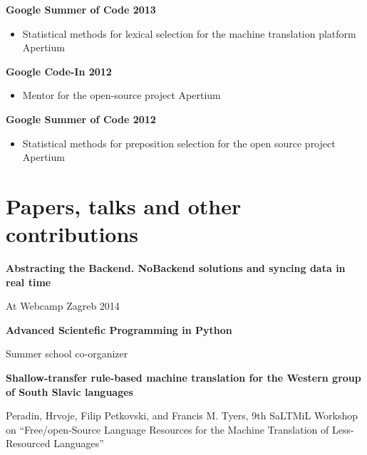 \documentclass[margin,line]{resume}
\begin{document}
\begin{resume}
    \textbf{Google Summer of Code 2013} \vspace{1mm}
    \begin{itemize}
      \item Statistical methods for lexical selection for the machine translation platform Apertium
            \vspace{-1mm}
    \end{itemize}

    \textbf{Google Code-In 2012} \vspace{1mm}
    \begin{itemize}
      \item Mentor for the open-source project Apertium \vspace{-1mm}
    \end{itemize}

    \textbf{Google Summer of Code 2012} \vspace{1mm}
    \begin{itemize}
      \item Statistical methods for preposition selection for the open source project Apertium \vspace{-1mm}
    \end{itemize}
    \section{\mysidestyle Papers, talks and other contributions}

    \textbf{Abstracting the Backend. NoBackend solutions and syncing data in real time}
    \begin{list2}
    \item At Webcamp Zagreb 2014
    \end{list2}

    \textbf{Advanced Scientefic Programming in Python}
    \begin{list2}
    \item Summer school co-organizer
    \end{list2}
    
    \textbf{Shallow-transfer rule-based machine translation for the Western group of South Slavic languages}
    \begin{list2}
    \item Peradin, Hrvoje, Filip Petkovski, and Francis M. Tyers, 9th SaLTMiL Workshop on “Free/open-Source Language Resources for the Machine Translation of Less-Resourced Languages”
    \end{list2}


\end{resume}
\end{document}
